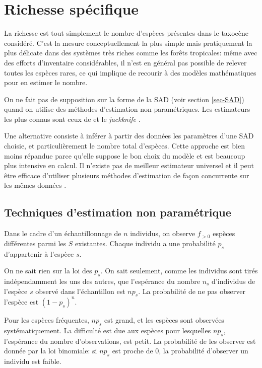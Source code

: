 \documentclass[
  11pt,
  american,
  a4paper,
  extrafontsizes,onecolumn,openright
  ]{memoir}
\begin{document}
\section{Richesse spécifique}\label{sec-Richesse}

La richesse est tout simplement le nombre d'espèces présentes dans le taxocène considéré.
C'est la mesure conceptuellement la plus simple mais pratiquement la plus délicate dans des systèmes très riches comme les forêts tropicales: même avec des efforts d'inventaire considérables, il n'est en général pas possible de relever toutes les espèces rares, ce qui implique de recourir à des modèles mathématiques pour en estimer le nombre.

On ne fait pas de supposition sur la forme de la SAD (voir section \ref{sec-SAD}) quand on utilise des méthodes d'estimation non paramétriques.
Les estimateurs les plus connus sont ceux de \textcite{Chao1984} et le \emph{jackknife} \autocite{Burnham1979}.

Une alternative consiste à inférer à partir des données les paramètres d'une SAD choisie, et particulièrement le nombre total d'espèces.
Cette approche est bien moins répandue parce qu'elle suppose le bon choix du modèle et est beaucoup plus intensive en calcul.
Il n'existe pas de meilleur estimateur universel \autocite{OHara2005} et il peut être efficace d'utiliser plusieurs méthodes d'estimation de façon concurrente sur les mêmes données \autocite{Basset2012}.

\subsection{Techniques d'estimation non paramétrique}\label{techniques-destimation-non-paramuxe9trique}

Dans le cadre d'un échantillonnage de \(n\) individus, on observe \(f_{>0}\) espèces différentes parmi les \(S\) existantes.
Chaque individu a une probabilité \(p_s\) d'appartenir à l'espèce \(s\).

On ne sait rien sur la loi des \(p_s\).
On sait seulement, comme les individus sont tirés indépendamment les uns des autres, que l'espérance du nombre \(n_s\) d'individus de l'espèce \(s\) observé dans l'échantillon est \(np_s\).
La probabilité de ne pas observer l'espèce est \((1-p_s)^n\).

Pour les espèces fréquentes, \(np_s\) est grand, et les espèces sont observées systématiquement.
La difficulté est due aux espèces pour lesquelles \(np_s\), l'espérance du nombre d'observations, est petit.
La probabilité de les observer est donnée par la loi binomiale: si \(np_s\) est proche de 0, la probabilité d'observer un individu est faible.
\end{document}
